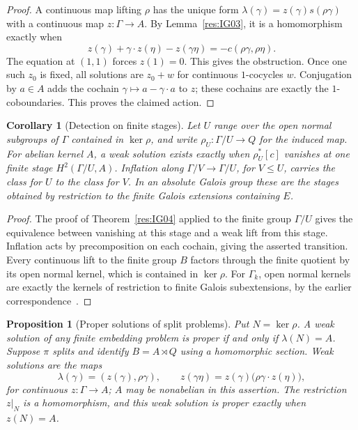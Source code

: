 \documentclass[11pt,oneside,openany]{book}
\newtheorem{proposition}[theorem]{Proposition}
\newtheorem{corollary}[theorem]{Corollary}
\theoremstyle{definition}
\theoremstyle{remark}
\begin{document}
\begin{proof}
A continuous map lifting \(\rho\) has the unique form
\(\lambda(\gamma)=z(\gamma)s(\rho\gamma)\) with a continuous
map \(z\colon\Gamma\to A\). By Lemma~\ref{res:IG03}, it is a
homomorphism exactly when
\[
   z(\gamma)+\gamma\cdot z(\eta)-z(\gamma\eta)
           =-c(\rho\gamma,\rho\eta).
\]
The equation at \((1,1)\) forces \(z(1)=0\).
This gives the obstruction. Once one such \(z_0\) is fixed, all
solutions are \(z_0+w\) for continuous \(1\)-cocycles \(w\).
Conjugation by \(a\in A\) adds the cochain
\(\gamma\mapsto a-\gamma\cdot a\) to \(z\); these cochains are
exactly the \(1\)-coboundaries. This proves the claimed action.
\end{proof}

\begin{corollary}[Detection on finite stages]
\label{res:IG05}
Let \(U\) range over the open normal subgroups of \(\Gamma\) contained
in \(\ker\rho\), and write \(\rho_U\colon\Gamma/U\to Q\) for
the induced map. For abelian kernel \(A\), a weak solution exists
exactly when \(\rho_U^*[c]\) vanishes at one finite stage
\(H^2(\Gamma/U,A)\). Inflation along
\(\Gamma/V\to\Gamma/U\), for \(V\leq U\), carries the class
for \(U\) to the class for \(V\). In an absolute Galois group these
are the stages obtained by restriction to the finite Galois
extensions containing \(E\).
\end{corollary}

\begin{proof}
The proof of Theorem~\ref{res:IG04} applied to the finite group
\(\Gamma/U\) gives the equivalence between vanishing at this
stage and a weak lift from this stage. Inflation acts by
precomposition on each cochain, giving the asserted transition.
Every continuous lift to the finite group \(B\) factors through
the finite quotient by its open normal kernel, which is contained
in \(\ker\rho\). For \(\Gamma_k\), open normal kernels are exactly
the kernels of restriction to finite Galois subextensions, by
the earlier correspondence~\cite[Results C06 and C08--C09]{mg-aft}.
\end{proof}

\begin{proposition}[Proper solutions of split problems]
\label{res:IG06}
Put \(N=\ker\rho\). A weak solution of any finite embedding problem
is proper if and only if \(\lambda(N)=A\).
Suppose \(\pi\) splits and identify \(B=A\rtimes Q\) using a
homomorphic section. Weak solutions are the maps
\[
 \lambda(\gamma)=(z(\gamma),\rho\gamma),\qquad
 z(\gamma\eta)=z(\gamma)\bigl(\rho\gamma\cdot z(\eta)\bigr),
\]
for continuous \(z\colon\Gamma\to A\); \(A\) may be nonabelian
in this assertion. The restriction \(z|_N\) is a homomorphism,
and this weak solution is proper exactly when \(z(N)=A\).
\end{proposition}
\end{document}
